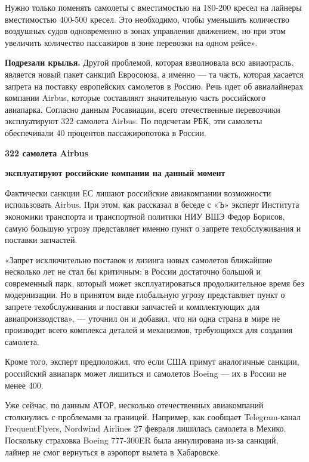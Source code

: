 Нужно только поменять самолеты с вместимостью на 180-200 кресел на лайнеры вместимостью 400-500 кресел. Это необходимо, чтобы уменьшить количество воздушных судов одновременно в зонах управления движением, но при этом увеличить количество пассажиров в зоне перевозки на одном рейсе».

\textbf{Подрезали крылья.} Другой проблемой, которая взволновала всю авиаотрасль, является новый пакет санкций Евросоюза, а именно --- та часть, которая касается запрета на поставку европейских самолетов в Россию. Речь идет об авиалайнерах компании Airbus, которые составляют значительную часть российского авиапарка. Согласно данным Росавиации, всего отечественные перевозчики эксплуатируют 322 самолета Airbus. По подсчетам РБК, эти самолеты обеспечивали 40 процентов пассажиропотока в России.

\begin{center}
    {\bf \huge 322 самолета Airbus}

    \textbf{эксплуатируют российские компании на данный момент}
\end{center}

Фактически санкции ЕС лишают российские авиакомпании возможности использовать Airbus. При этом, как рассказал в беседе с «Ъ» эксперт Института экономики транспорта и транспортной политики НИУ ВШЭ Федор Борисов, самую большую угрозу представляет именно пункт о запрете техобслуживания и поставки запчастей.

«Запрет исключительно поставок и лизинга новых самолетов ближайшие несколько лет не стал бы критичным: в России достаточно большой и современный парк, который может эксплуатироваться продолжительное время без модернизации. Но в принятом виде глобальную угрозу представляет пункт о запрете техобслуживания и поставки запчастей и комплектующих для авиапроизводства», --- уточнил он и добавил, что ни одна страна в мире не производит всего комплекса деталей и механизмов, требующихся для создания самолета.

Кроме того, эксперт предположил, что если США примут аналогичные санкции, российский авиапарк может лишиться и самолетов Boeing --- их в России не менее 400.

Уже сейчас, по данным АТОР, несколько отечественных авиакомпаний столкнулись с проблемами за границей. Например, как сообщает Telegram-канал FrequentFlyers, Nordwind Airlines 27 февраля лишилась самолета в Мехико. Поскольку страховка Boeing 777-300ER была аннулирована из-за санкций, лайнер не смог вернуться в аэропорт вылета в Хабаровске.

